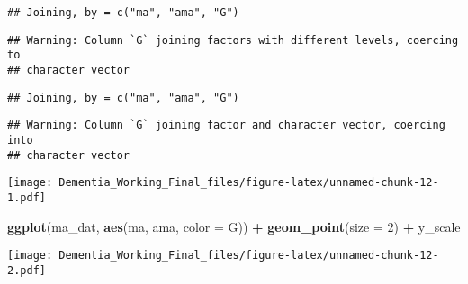 \documentclass[]{article}
\newenvironment{Shaded}{\begin{snugshade}}{\end{snugshade}}
\newcommand{\DataTypeTok}[1]{\textcolor[rgb]{0.13,0.29,0.53}{#1}}
\newcommand{\DecValTok}[1]{\textcolor[rgb]{0.00,0.00,0.81}{#1}}
\newcommand{\KeywordTok}[1]{\textcolor[rgb]{0.13,0.29,0.53}{\textbf{#1}}}
\newcommand{\NormalTok}[1]{#1}
\newcommand{\OperatorTok}[1]{\textcolor[rgb]{0.81,0.36,0.00}{\textbf{#1}}}
\newcommand{\StringTok}[1]{\textcolor[rgb]{0.31,0.60,0.02}{#1}}
\begin{document}
\begin{verbatim}
## Joining, by = c("ma", "ama", "G")
\end{verbatim}

\begin{verbatim}
## Warning: Column `G` joining factors with different levels, coercing to
## character vector
\end{verbatim}

\begin{verbatim}
## Joining, by = c("ma", "ama", "G")
\end{verbatim}

\begin{verbatim}
## Warning: Column `G` joining factor and character vector, coercing into
## character vector
\end{verbatim}

\begin{Shaded}
\end{Shaded}

\texttt{[image: Dementia\_Working\_Final\_files/figure-latex/unnamed-chunk-12-1.pdf]}

\begin{Shaded}
\begin{Highlighting}[]
\KeywordTok{ggplot}\NormalTok{(ma_dat, }\KeywordTok{aes}\NormalTok{(ma, ama, }\DataTypeTok{color =}\NormalTok{ G)) }\OperatorTok{+}\StringTok{ }\KeywordTok{geom_point}\NormalTok{(}\DataTypeTok{size =} \DecValTok{2}\NormalTok{) }\OperatorTok{+}\StringTok{ }\NormalTok{y_scale}
\end{Highlighting}
\end{Shaded}

\texttt{[image: Dementia\_Working\_Final\_files/figure-latex/unnamed-chunk-12-2.pdf]}

\begin{Shaded}
\end{Shaded}
\end{document}
